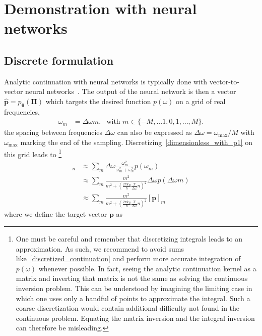 \documentclass[notitlepage, 11pt, nofootinbib]{revtex4-1}
\renewcommand{\vec}[1]{\bm{#1}}
\begin{document}
\section{Demonstration with neural networks}


\subsection{Discrete formulation}
\label{section_discrete}

Analytic continuation with neural networks is typically done with vector-to-vector neural networks~\cite{Fournier2020,Xie2019,Yoon2018,Kades2019}. The output of the neural network is then a vector $\hat{\vec p} = p_{\vec \theta}(\vec \Pi)$ which targets the desired function $p(\omega)$ on a grid of real frequencies,
\begin{align}
\omega_m &=
\Delta\omega m.
&\text{with }m\in\{-M,...1,0,1,...,M\}.
\label{eq_discrete_grid}
\end{align}
the spacing between frequencies $\Delta \omega$ can also be expressed as $\Delta\omega =\omega_{\text{max}}/M$ with $\omega_{\text{max}}$ marking the end of the sampling. Discretizing~\eqref{dimensionless_with_p1} on this grid leads to
\footnote{One must be careful and remember that discretizing integrals leads to an approximation. 
As such, we recommend to avoid sums like~\eqref{discretized_continuation} and perform more accurate integration of $p(\omega)$ whenever possible.
In fact, seeing the analytic continuation kernel as a matrix and inverting that matrix is not the same as solving the continuous inversion problem. This can be understood by imagining the limiting case in which one uses only a handful of points to approximate the integral. Such a coarse discretization would contain additional difficulty not found in the continuous problem. Equating the matrix inversion and the integral inversion can therefore be misleading.
}
\begin{align}
[\vec \Pi]_n
&\approx
\sum_{m}
\Delta\omega \frac{\omega_m^2}{\omega_m^2+\omega_n^2} p(\omega_m)
\label{discretized_continuation_1}
\\
&\approx
\sum_{m}
\frac{m^2}{m^2+(\frac{2\pi k_B}{\hbar}\frac{T}{\Delta\omega}n)^2} \Delta\omega p(\Delta\omega m)
\\
&\approx
\sum_{m}
\frac{m^2}{m^2+(\frac{2\pi k_B}{\hbar}\frac{T}{\Delta\omega}n)^2} 
[\vec p]_m
\label{discretized_continuation}
\end{align}
where we define the target vector $\vec p$ as
\end{document}

